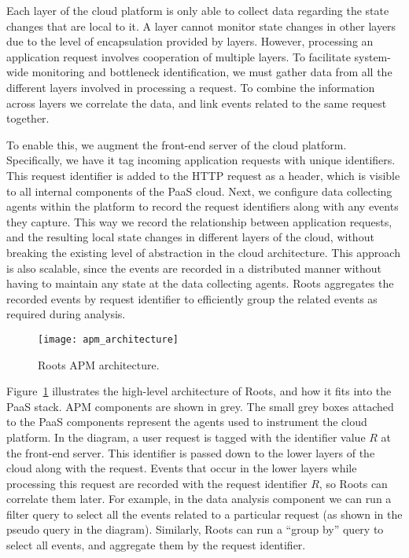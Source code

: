 Each layer of the cloud platform is only able to collect data regarding the
state changes that are local to it. A layer cannot monitor state changes
in other layers due to the level of encapsulation provided by layers. However,
processing an application request involves cooperation of multiple layers. 
To facilitate system-wide monitoring and
bottleneck identification, we must gather data from all the different layers involved
in processing a request. To combine the information across layers
we correlate the data, and link events related to the same request together.

To enable this, we augment the front-end server of the cloud platform. 
Specifically, we have it tag incoming application requests with unique identifiers.
This request identifier is added to the HTTP request as a header, which is visible to all 
internal components of the PaaS cloud. Next, we configure data collecting agents 
within the platform to record the request identifiers along with any events they capture. 
This way we record the relationship between application requests, and the resulting
local state changes in different layers of the cloud, without breaking the existing level
of abstraction in the cloud architecture. This approach is also scalable, since the events are
recorded in a distributed manner without having to maintain any state at the data collecting agents. 
Roots aggregates the recorded events by request 
identifier to efficiently group the related events as required during analysis.

\begin{figure}
\centering
\texttt{[image: apm\_architecture]}
\caption{Roots APM architecture.}
\label{fig:apm_architecture}
\end{figure}

Figure~\ref{fig:apm_architecture} illustrates the high-level architecture of Roots, and how 
it fits into the PaaS stack. APM components are shown in grey. 
The small grey boxes attached to the PaaS components represent the
agents used to instrument the cloud platform. 
In the diagram, a user request is tagged with the identifier value
$R$ at the front-end server. This identifier is passed down to the lower layers of the cloud
along with the request. Events that occur in the lower layers while processing this request
are recorded with the request identifier $R$, so Roots can correlate them later. For example, in the 
data analysis component we can run a filter query to select all the events related to a particular
request (as shown in the pseudo query in the diagram). Similarly, Roots can run a ``group by'' 
query to select all events, and aggregate them by the request identifier.

